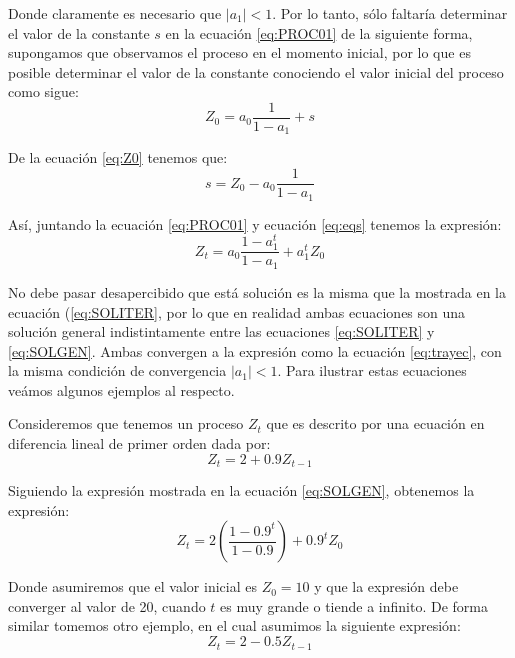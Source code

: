 \documentclass[
]{book}
\begin{document}
Donde claramente es necesario que \(|a_1| < 1\). Por lo tanto, sólo faltaría determinar el valor de la constante \(s\) en la ecuación \eqref{eq:PROC01} de la siguiente forma, supongamos que observamos el proceso en el momento inicial, por lo que es posible determinar el valor de la constante conociendo el valor inicial del proceso como sigue:
\begin{equation}
    Z_0 = a_0 \frac{1}{1 - a_1} + s
\label{eq:Z0}
\end{equation}

De la ecuación \eqref{eq:Z0} tenemos que:
\begin{equation}
    s = Z_0 - a_0 \frac{1}{1 - a_1}
\label{eq:eqs}
\end{equation}

Así, juntando la ecuación \eqref{eq:PROC01} y ecuación \eqref{eq:eqs} tenemos la expresión:
\begin{equation}
    Z_t = a_0 \frac{1 - a^t_1}{1 - a_1} + a^t_1 Z_0
\label{eq:SOLGEN}
\end{equation}

No debe pasar desapercibido que está solución es la misma que la mostrada en la ecuación (\eqref{eq:SOLITER}, por lo que en realidad ambas ecuaciones son una solución general indistintamente entre las ecuaciones \eqref{eq:SOLITER} y \eqref{eq:SOLGEN}. Ambas convergen a la expresión como la ecuación \eqref{eq:trayec}, con la misma condición de convergencia \(|a_1| < 1\). Para ilustrar estas ecuaciones veámos algunos ejemplos al respecto.

Consideremos que tenemos un proceso \(Z_t\) que es descrito por una ecuación en diferencia lineal de primer orden dada por:
\begin{equation}
    Z_t = 2 + 0.9 Z_{t-1}
\label{eq:ex1}
\end{equation}

Siguiendo la expresión mostrada en la ecuación \eqref{eq:SOLGEN}, obtenemos la expresión:
\begin{equation}
    Z_t = 2 \left( \frac{1 - 0.9^{t}}{1 - 0.9} \right) + 0.9^t Z_0
\label{eq:ex2}
\end{equation}

Donde asumiremos que el valor inicial es \(Z_0 = 10\) y que la expresión debe converger al valor de 20, cuando \(t\) es muy grande o tiende a infinito. De forma similar tomemos otro ejemplo, en el cual asumimos la siguiente expresión:
\begin{equation}
    Z_t = 2 - 0.5 Z_{t-1}
\label{eq:ex3}
\end{equation}
\end{document}
